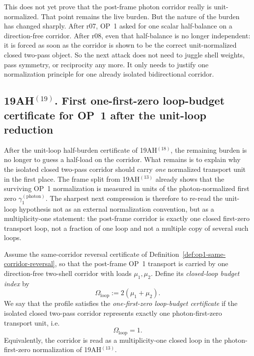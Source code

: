 \begin{remark}
This does not yet prove that the post-frame photon corridor really is unit-normalized. That point remains the live burden. But the nature of the burden has changed sharply. After r07, OP~1 asked for one scalar half-balance on a direction-free corridor. After r08, even that half-balance is no longer independent: it is forced as soon as the corridor is shown to be the correct unit-normalized closed two-pass object. So the next attack does not need to juggle shell weights, pass symmetry, or reciprocity any more. It only needs to justify one normalization principle for one already isolated bidirectional corridor.
\end{remark}


\subsection*{19AH$^{(19)}$. First one-first-zero loop-budget certificate for OP~1 after the unit-loop reduction}
After the unit-loop half-burden certificate of 19AH$^{(18)}$, the remaining burden is no longer to guess a half-load on the corridor. What remains is to explain why the isolated closed two-pass corridor should carry \emph{one} normalized transport unit in the first place. The frame split from 19AH$^{(13)}$ already shows that the surviving OP~1 normalization is measured in units of the photon-normalized first zero \(\gamma_1^{(\mathrm{photon})}\). The sharpest next compression is therefore to re-read the unit-loop hypothesis not as an external normalization convention, but as a multiplicity-one statement: the post-frame corridor is exactly one closed first-zero transport loop, not a fraction of one loop and not a multiple copy of several such loops.

\begin{definition}
\label{def:op1-one-first-zero-loop-budget}
Assume the same-corridor reversal certificate of Definition~\ref{def:op1-same-corridor-reversal}, so that the post-frame OP~1 transport is carried by one direction-free two-shell corridor with loads \(\mu_1,\mu_2\). Define its \emph{closed-loop budget index} by
\[
  \Omega_{\mathrm{loop}} := 2(\mu_1+\mu_2).
\]
We say that the profile satisfies the \emph{one-first-zero loop-budget certificate} if the isolated closed two-pass corridor represents exactly one photon-first-zero transport unit, i.e.
\[
  \Omega_{\mathrm{loop}} = 1.
\]
Equivalently, the corridor is read as a multiplicity-one closed loop in the photon-first-zero normalization of 19AH$^{(13)}$.
\end{definition}


